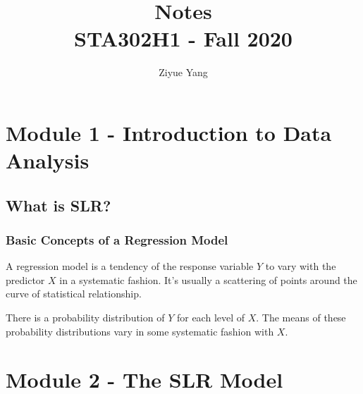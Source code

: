 \documentclass[11pt]{article}
\title{Notes\\
  {\large STA302H1 - Fall 2020}}
\author{Ziyue Yang}
\theoremstyle{definition}
\newtheorem{definition}{Definition}[section]
\numberwithin{equation}{section}
\begin{document}
\maketitle

\tableofcontents

\newpage

\section{Module 1 - Introduction to Data Analysis}







\subsection{What is SLR?}

\subsubsection{Basic Concepts of a Regression Model}

A regression model is a tendency of the response variable $Y$ to vary with the predictor $X$ in a systematic fashion. It's usually a scattering of points around the curve of statistical relationship.

There is a probability distribution of $Y$ for each level of $X$. The means of these probability distributions vary in some systematic fashion with $X$.



\newpage

\section{Module 2 - The SLR Model}
\end{document}
